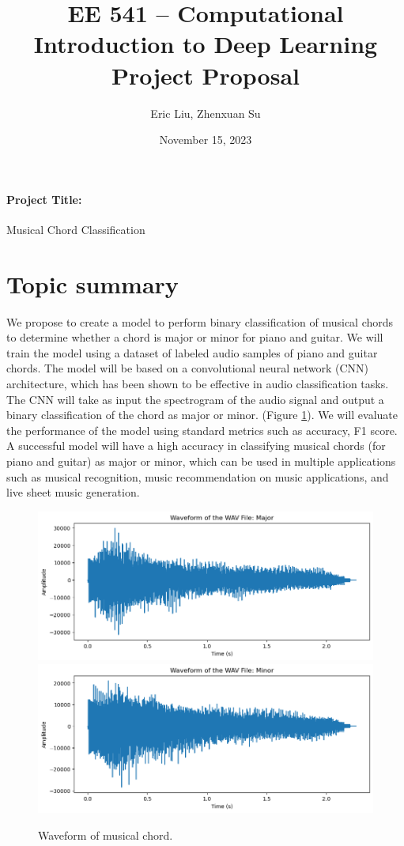 \documentclass[11pt]{article}
\title{\bf {\small EE 541 -- Computational Introduction to Deep Learning} \\ Project Proposal}
\author{Eric Liu, Zhenxuan Su}
\date{November 15, 2023}
\begin{document}
\maketitle

\paragraph{Project Title:}  Musical Chord Classification

\section*{Topic summary}


\noindent
We propose to create a model to perform binary classification of musical chords to determine whether a chord is major or minor for piano and guitar. 
We will train the model using a dataset of labeled audio samples of piano and guitar chords.
The model will be based on a convolutional neural network (CNN) architecture, which has been shown to be effective in audio classification tasks. 
The CNN will take as input the spectrogram of the audio signal and output a binary classification of the chord as major or minor.   (Figure \ref{fig:waveform}).
We will evaluate the performance of the model using standard metrics such as accuracy, F1 score. 
A successful model will have a high accuracy in classifying musical chords (for piano and guitar) as major or minor, which can be used in multiple applications such as  musical recognition, music recommendation on music applications, and live sheet music generation.

\begin{figure}[!htb]
  \begin{center}
  \includegraphics[width=0.75\linewidth]{./Figure/Majorwave.png}
   \includegraphics[width=0.75\linewidth]{./Figure/Minorwave.png}
  \caption{Waveform of musical chord.}
  \label{fig:waveform}
  \end{center}
  \vspace{-0.6cm}
\end{figure}
\end{document}
